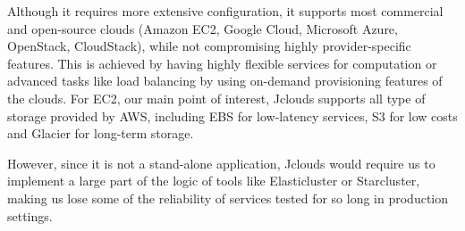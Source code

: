 Although it requires more extensive configuration, it supports most commercial and open-source clouds (Amazon EC2, Google Cloud, Microsoft Azure, OpenStack, CloudStack), while not compromising highly provider-specific features. This is achieved by having highly flexible services for computation or advanced tasks like load balancing by using on-demand provisioning features of the clouds. For EC2, our main point of interest, Jclouds supports all type of storage provided by AWS, including EBS for low-latency services, S3 for low costs and Glacier for long-term storage.

However, since it is not a stand-alone application, Jclouds would require us to implement a large part of the logic of tools like Elasticluster or Starcluster, making us lose some of the reliability of services tested for so long in production settings.


